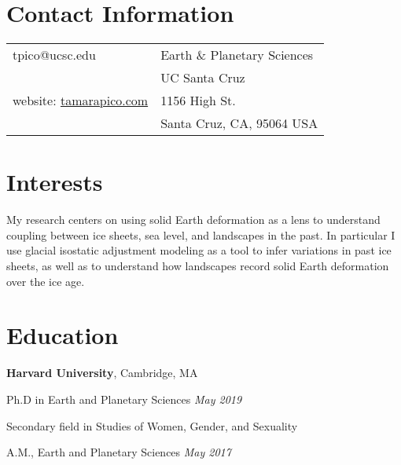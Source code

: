 \documentclass[margin,line]{res}
\newenvironment{list1}{
  \begin{list}{\ding{113}}{%
      \setlength{\itemsep}{0in}
      \setlength{\parsep}{0in} \setlength{\parskip}{0in}
      \setlength{\topsep}{0in} \setlength{\partopsep}{0in} 
      \setlength{\leftmargin}{0.00in}}}{\end{list}}
\begin{document}

\begin{resume}
\section{\sc Contact Information}
\vspace{.05in}

\begin{tabular}{@{}p{3in}p{3in}}
   tpico@ucsc.edu & Earth \& Planetary Sciences \\ 
  &UC Santa Cruz \\
website: \href{https://tamarapico.github.io//}{tamarapico.com} & 1156 High St.\\
& Santa Cruz, CA, 95064 USA \\    

   
\end{tabular}



\section{\sc Interests}

My research centers on using solid Earth deformation as a lens to understand coupling between ice sheets, sea level, and landscapes in the past. In particular I use glacial isostatic adjustment modeling as a tool to infer variations in past ice sheets, as well as to understand how landscapes record solid Earth deformation over the ice age. 

\section{\sc Education}
{\bf Harvard University}, Cambridge, MA\\
\vspace*{-.1in}
\begin{list1}
\item[] Ph.D in Earth and Planetary Sciences \hfill {\em May 2019} 
\item[] Secondary field in Studies of Women, Gender, and Sexuality
\item[] A.M., Earth and Planetary Sciences \hfill {\em May 2017}  \\
 

\end{list1}
\end{resume}
\end{document}
